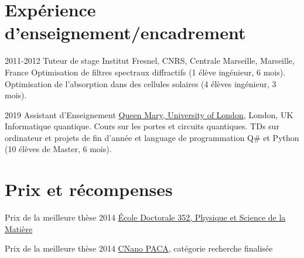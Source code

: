 \documentclass{cv}
\begin{document}

\vspace*{-0.2cm}
\section{Expérience d'enseignement/encadrement}

\begin{entrylist}
	\entry
	{2011-2012}
	{Tuteur de stage}
	{{Institut Fresnel}, CNRS, Centrale Marseille, Marseille, France}
	{Optimisation de filtres spectraux diffractifs (1 élève ingénieur, 6 mois).\\
		Optimisation de l'absorption dans des cellules solaires (4 élèves ingénieur, 3 mois).
	}

	\entry
	{2019}
	{Assistant d'Enseignement}
	{\href{http://antennas.eecs.qmul.ac.uk/}{Queen Mary, University of London}, London, UK}
	{Informatique quantique. Cours sur les portes et circuits quantiques. 
	TDs sur ordinateur et projets de fin d'année et language de programmation Q\# et Python (10 élèves de Master, 6 mois).}


\end{entrylist}

\vspace*{-0.2cm}
\section{Prix et récompenses}

  {Prix de la meilleure thèse 2014} {\href{https://ecole-doctorale-352.univ-amu.fr/en}{\'Ecole Doctorale 352, Physique et Science de la Matière}}

  {Prix de la meilleure thèse 2014 {\href{https://www.cnano-paca.fr/index.php?option=com_content&view=article&id=80}{CNano PACA}}, catégorie recherche finalisée}





\end{document}
